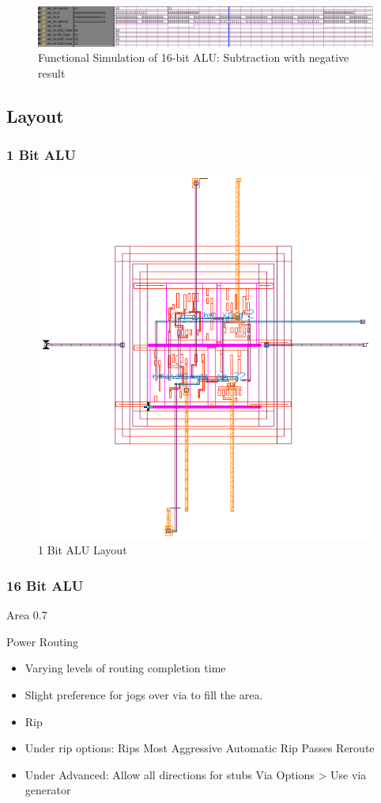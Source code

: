\documentclass[11pt]{article}
\begin{document}
{	
			\begin{figure}[H]
				\centering
				\includegraphics[width=0.7\linewidth]{"Pictures/16 Bit ALU Sub Neg"}
				\caption{Functional Simulation of 16-bit ALU: Subtraction with negative result}
				\label{fig:16-bit-alu-sub-neg}
			\end{figure}
		
		
	\subsection{Layout}
	
		\subsubsection{1 Bit ALU}
		
			\begin{figure}[H]
				\centering
				\includegraphics[width=0.7\linewidth]{"Pictures/ALU-1Bit Layout"}
				\caption{1 Bit ALU Layout}
				\label{fig:alu-1bit-layout}
			\end{figure}
			
	
		\subsubsection{16 Bit ALU}
			
			Area 0.7
			
			Power Routing
			\begin{itemize}
				\item Varying levels of routing completion time
				\item Slight preference for jogs over via to fill the area.
				\item Rip
				\item Under rip options: 
				\subitem Rips Most Aggressive
				\subitem Automatic Rip Passes
				\subitem Reroute
				\item Under Advanced:
				\subitem Allow all directions for stubs
				\subitem Via Options > Use via generator
			\end{itemize}
		
}
\end{document}
